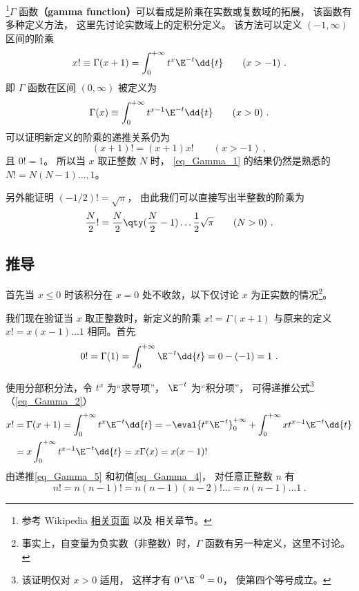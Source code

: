 

\footnote{参考 Wikipedia \href{https://en.wikipedia.org/wiki/Gamma_function}{相关页面} 以及 \cite{Arfken} 相关章节。}$\Gamma$ 函数\textbf{（gamma function）}可以看成是阶乘在实数或复数域的拓展， 该函数有多种定义方法， 这里先讨论实数域上的定积分定义。 该方法可以定义 $(-1, \infty)$ 区间的阶乘
\begin{equation}\label{eq_Gamma_1}
x! \equiv \Gamma (x + 1) = \int_0^{+\infty} t^x \E^{-t} \dd{t} \qquad (x > -1)~.
\end{equation}
即 $\Gamma$ 函数在区间 $(0,\infty)$ 被定义为
\begin{equation}\label{eq_Gamma_3}
\Gamma(x) \equiv \int_0^{+\infty} t^{x-1} \E^{-t} \dd{t} \qquad (x > 0)~.
\end{equation}
可以证明新定义的阶乘的递推关系仍为
\begin{equation}\label{eq_Gamma_2}
(x+1)!=(x+1)x! \qquad (x>-1)~,
\end{equation}
且 $0! = 1$。 所以当 $x$ 取正整数 $N$ 时， \autoref{eq_Gamma_1} 的结果仍然是熟悉的 $N! = N(N-1)\dots, 1$。

另外能证明 $(-1/2)!=\sqrt{\pi}$， 由此我们可以直接写出半整数的阶乘为
\begin{equation}
\frac{N}{2}! = \frac{N}{2} \qty(\frac{N}{2}-1) \dots \frac12 \sqrt{\pi} \qquad (N > 0)~.
\end{equation}

\subsection{推导}
首先当 $x \leqslant 0$ 时该积分在 $x=0$ 处不收敛，以下仅讨论 $x$ 为正实数的情况\footnote{事实上，自变量为负实数（非整数）时，$\Gamma$ 函数有另一种定义，这里不讨论。}。

我们现在验证当 $x$ 取正整数时，新定义的阶乘 $x! = \Gamma(x+1)$ 与原来的定义 $x! = x(x-1)\dots 1$ 相同。首先
\begin{equation}\label{eq_Gamma_4}
0! = \Gamma(1) = \int_0^{+\infty} \E^{-t} \dd{t} = 0 - (-1) = 1~.
\end{equation}

使用分部积分法，令 $t^x$ 为“求导项”， $\E^{-t}$ 为“积分项”， 可得递推公式\footnote{该证明仅对 $x>0$ 适用， 这样才有 $0^x \E^{-0} = 0$， 使第四个等号成立。}（\autoref{eq_Gamma_2}）
\begin{equation}\label{eq_Gamma_5}
\begin{aligned}
x! &= \Gamma(x+1) = \int_0^{+\infty} t^x \E^{-t} \dd{t} =  - \eval{t^x \E^{-t}}_{0}^{+\infty} + \int_0^{+\infty} x t^{x-1} \E^{-t} \dd{t} \\
&= x\int_0^{+\infty} t^{x-1} \E^{-t} \dd{t} = x\Gamma (x) = x(x-1)!
\end{aligned} \end{equation} 
由递推\autoref{eq_Gamma_5} 和初值\autoref{eq_Gamma_4}， 对任意正整数 $n$ 有
\begin{equation}
n! = n(n-1)! = n(n-1)(n-2)!... = n(n-1)...1~.
\end{equation}

